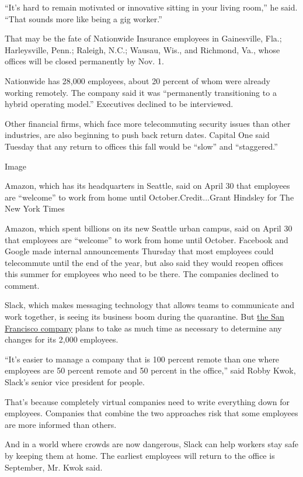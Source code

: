 ``It's hard to remain motivated or innovative sitting in your living
room,'' he said. ``That sounds more like being a gig worker.''

That may be the fate of Nationwide Insurance employees in Gainesville,
Fla.; Harleysville, Penn.; Raleigh, N.C.; Wausau, Wis., and Richmond,
Va., whose offices will be closed permanently by Nov. 1.

Nationwide has 28,000 employees, about 20 percent of whom were already
working remotely. The company said it was ``permanently transitioning to
a hybrid operating model.'' Executives declined to be interviewed.

Other financial firms, which face more telecommuting security issues
than other industries, are also beginning to push back return dates.
Capital One said Tuesday that any return to offices this fall would be
``slow'' and ``staggered.''

Image

Amazon, which has its headquarters in Seattle, said on April 30 that
employees are ``welcome'' to work from home until October.Credit...Grant
Hindsley for The New York Times

Amazon, which spent billions on its new Seattle urban campus, said on
April 30 that employees are ``welcome'' to work from home until October.
Facebook and Google made internal announcements Thursday that most
employees could telecommute until the end of the year, but also said
they would reopen offices this summer for employees who need to be
there. The companies declined to comment.

Slack, which makes messaging technology that allows teams to communicate
and work together, is seeing its business boom during the quarantine.
But
\href{https://www.nytimes3xbfgragh.onion/2019/06/02/technology/slack-stewart-butterfield.html}{the
San Francisco company} plans to take as much time as necessary to
determine any changes for its 2,000 employees.

``It's easier to manage a company that is 100 percent remote than one
where employees are 50 percent remote and 50 percent in the office,''
said Robby Kwok, Slack's senior vice president for people.

That's because completely virtual companies need to write everything
down for employees. Companies that combine the two approaches risk that
some employees are more informed than others.

And in a world where crowds are now dangerous, Slack can help workers
stay safe by keeping them at home. The earliest employees will return to
the office is September, Mr. Kwok said.

